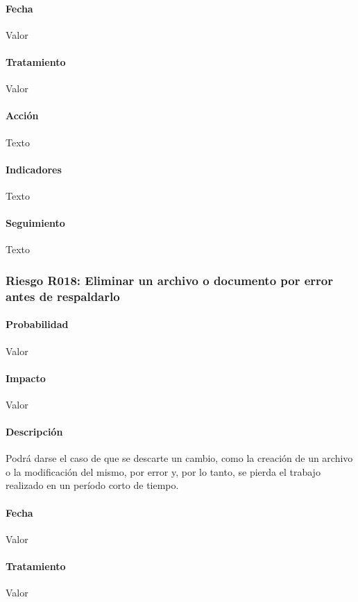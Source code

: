 \documentclass[10pt,a4paper]{article}
\begin{document}
				\paragraph{Fecha} Valor %
				\paragraph{Tratamiento} Valor %
				\paragraph{Acción} Texto %
				\paragraph{Indicadores} Texto %
				\paragraph{Seguimiento}	Texto %
				\subsubsection{Riesgo R018: Eliminar un archivo o documento por error antes de respaldarlo}
				\paragraph{Probabilidad} Valor
				\paragraph{Impacto}	Valor
				\paragraph{Descripción} Podrá darse el caso de que se descarte un cambio, como la creación de un archivo o la modificación del mismo, por error y, por lo tanto, se pierda el trabajo realizado en un período corto de tiempo.
				\paragraph{Fecha} Valor %
				\paragraph{Tratamiento} Valor %
\end{document}
